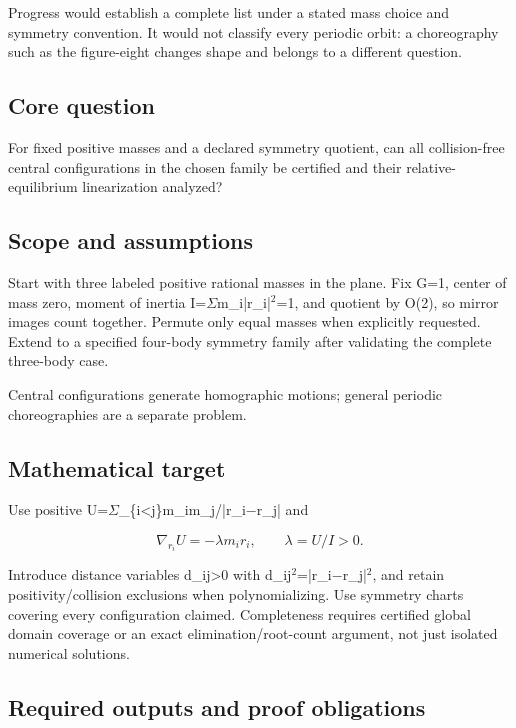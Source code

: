 \documentclass[
  11pt,
]{article}
\begin{document}
Progress would establish a complete list under a stated mass choice and
symmetry convention. It would not classify every periodic orbit: a
choreography such as the figure-eight changes shape and belongs to a
different question.

\subsection{Core question}

For fixed positive masses and a declared symmetry quotient, can all
collision-free central configurations in the chosen family be certified
and their relative-equilibrium linearization analyzed?

\subsection{Scope and assumptions}

Start with three labeled positive rational masses in the plane. Fix G=1,
center of mass zero, moment of inertia
I=\ensuremath{\Sigma}m\_i|r\_i|\ensuremath{{}^{2}}=1, and quotient by
O(2), so mirror images count together. Permute only equal masses when
explicitly requested. Extend to a specified four-body symmetry family
after validating the complete three-body case.

Central configurations generate homographic motions; general periodic
choreographies are a separate problem.

\subsection{Mathematical target}

Use positive
U=\ensuremath{\Sigma}\_\{i<j\}m\_im\_j/|r\_i\ensuremath{-}r\_j| and

\[\nabla_{r_i}U=-\lambda m_ir_i,\qquad \lambda =U/I>0.\]

Introduce distance variables d\_ij\textgreater0 with
d\_ij\ensuremath{{}^{2}}=|r\_i\ensuremath{-}r\_j|\ensuremath{{}^{2}},
and retain positivity/collision exclusions when polynomializing. Use
symmetry charts covering every configuration claimed. Completeness
requires certified global domain coverage or an exact
elimination/root-count argument, not just isolated numerical solutions.

\subsection{Required outputs and proof obligations}
\end{document}
